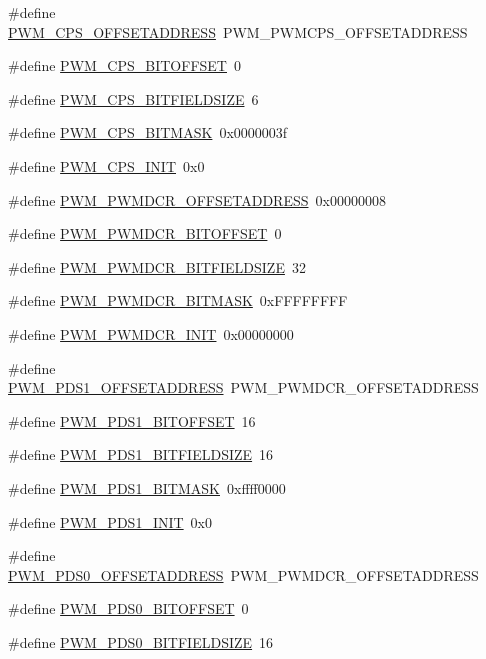 \begin{DoxyCompactItemize}
\item 
\#define \hyperlink{a00565_a73d74355f535b5295698ee741a1fc8b3}{PWM\_\-CPS\_\-OFFSETADDRESS}~PWM\_\-PWMCPS\_\-OFFSETADDRESS
\item 
\#define \hyperlink{a00565_a1bbad1be0bd416872c86c6bbd7aecabc}{PWM\_\-CPS\_\-BITOFFSET}~0
\item 
\#define \hyperlink{a00565_aff1828ea2804b30439108c4581c69afe}{PWM\_\-CPS\_\-BITFIELDSIZE}~6
\item 
\#define \hyperlink{a00565_a2bff5ec88be76abb7d9b1a79c7a4b1f2}{PWM\_\-CPS\_\-BITMASK}~0x0000003f
\item 
\#define \hyperlink{a00565_a656dfbd9b57eba7c922b69a1a96e50a3}{PWM\_\-CPS\_\-INIT}~0x0
\item 
\#define \hyperlink{a00565_aa1693c2827f9d8708ca5db029964edde}{PWM\_\-PWMDCR\_\-OFFSETADDRESS}~0x00000008
\item 
\#define \hyperlink{a00565_aac0b51e2bb02790b399b2c96855f6e5d}{PWM\_\-PWMDCR\_\-BITOFFSET}~0
\item 
\#define \hyperlink{a00565_adeda64484cdf91ad6227b3e202923a56}{PWM\_\-PWMDCR\_\-BITFIELDSIZE}~32
\item 
\#define \hyperlink{a00565_a0826361be1f002b278f3ac4cae30f3f4}{PWM\_\-PWMDCR\_\-BITMASK}~0xFFFFFFFF
\item 
\#define \hyperlink{a00565_a535f439651c1fb9edae479c50cf4e2b9}{PWM\_\-PWMDCR\_\-INIT}~0x00000000
\item 
\#define \hyperlink{a00565_aedcb01b681b85e2b4b769edc20acc37f}{PWM\_\-PDS1\_\-OFFSETADDRESS}~PWM\_\-PWMDCR\_\-OFFSETADDRESS
\item 
\#define \hyperlink{a00565_a003f5d5b2ba862041386fc85e91b535d}{PWM\_\-PDS1\_\-BITOFFSET}~16
\item 
\#define \hyperlink{a00565_a7264db9b33ba8cc42ff8de1a909850a4}{PWM\_\-PDS1\_\-BITFIELDSIZE}~16
\item 
\#define \hyperlink{a00565_ab1f290fb10c11f76a50cae8de640ff6d}{PWM\_\-PDS1\_\-BITMASK}~0xffff0000
\item 
\#define \hyperlink{a00565_ad27640307879d938cddb8c4b120cbcaa}{PWM\_\-PDS1\_\-INIT}~0x0
\item 
\#define \hyperlink{a00565_a53f03ec64fe15d3148e7ad970868031b}{PWM\_\-PDS0\_\-OFFSETADDRESS}~PWM\_\-PWMDCR\_\-OFFSETADDRESS
\item 
\#define \hyperlink{a00565_af3c6c14f418969466a1158fda8273532}{PWM\_\-PDS0\_\-BITOFFSET}~0
\item 
\#define \hyperlink{a00565_a36fe636cc40d9d2be64b0b2e23ee08d3}{PWM\_\-PDS0\_\-BITFIELDSIZE}~16

\end{DoxyCompactItemize}
